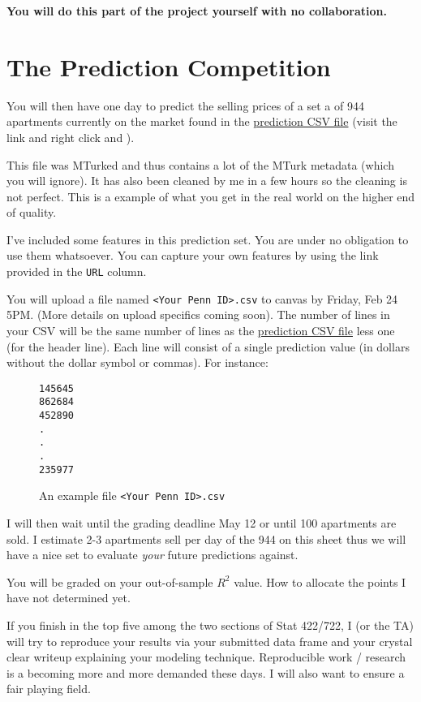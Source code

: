 \documentclass[12pt]{article}
\begin{document}
\textbf{You will do this part of the project yourself with no collaboration.}

\section{The Prediction Competition}

You will then have one day to predict the selling prices of a set a of 944 apartments currently on the market found in the \href{https://raw.githubusercontent.com/kapelner/Wharton_Stat_422_722/master/assignments/project/stat_422_722_project_prediction_set.csv}{prediction CSV file} (visit the link and right click and ). 

This file was MTurked and thus contains a lot of the MTurk metadata (which you will ignore). It has also been cleaned by me in a few hours so the cleaning is not perfect. This is a example of what you get in the real world on the higher end of quality.

I've included some features in this prediction set. You are under no obligation to use them whatsoever. You can capture your own features by using the link provided in the \texttt{URL} column.

You will upload a file named \texttt{<Your Penn ID>.csv} to canvas by Friday, Feb 24 5PM. (More details on upload specifics coming soon). The number of lines in your CSV will be the same number of lines as the \href{https://raw.githubusercontent.com/kapelner/Wharton_Stat_422_722/master/assignments/project/stat_422_722_project_prediction_set.csv}{prediction CSV file} less one (for the header line). Each line will consist of a single prediction value (in dollars without the dollar symbol or commas). For instance:

\begin{figure}[htp]
\begin{Verbatim}[frame=single, fontsize = \small]
145645
862684
452890
.
.
.
235977
\end{Verbatim}
\caption{An example file \texttt{<Your Penn ID>.csv}}
\end{figure}

I will then wait until the grading deadline May 12 or until 100 apartments are sold. I estimate 2-3 apartments sell per day of the 944 on this sheet thus we will have a nice set to evaluate \emph{your} future predictions against.

You will be graded on your out-of-sample $R^2$ value. How to allocate the points I have not determined yet.

If you finish in the top five among the two sections of Stat 422/722, I (or the TA) will try to reproduce your results via your submitted data frame and your crystal clear writeup explaining your modeling technique. Reproducible work / research is a becoming more and more demanded these days. I will also want to ensure a fair playing field.
\end{document}
